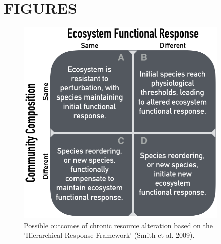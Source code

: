 \documentclass[fleqn,10pt,lineno]{wlpeerj} %
\begin{document}
\newpage{}

\section{FIGURES}\label{figures}

\begin{figure}[!ht]
  \centering
      \includegraphics[width=4in]{../figures/hypothesis_figtable.png}
  \caption{Possible outcomes of chronic resource alteration based on the 'Hierarchical Response Framework' (Smith et al. 2009).}
\end{figure}

\newpage{}
\end{document}
